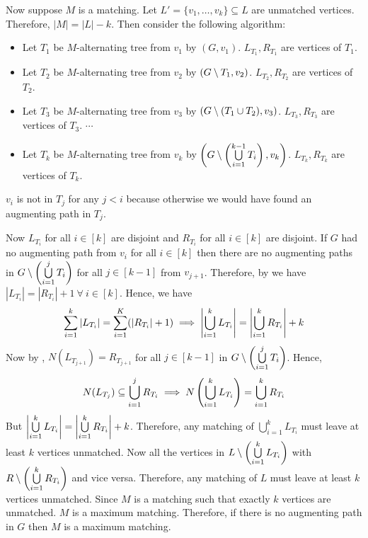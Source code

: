 Now suppose $M$ is a matching. Let $L'=\{v_1,\dots, v_k\}\subseteq L$ are unmatched vertices. Therefore, $|M|=|L|-k$. Then consider the following algorithm:
\begin{itemize}
	\item Let $T_1$ be $M$-alternating tree from $v_1$ by  $(G,v_1)$. $L_{T_1}, R_{T_1}$ are vertices of $T_1$.
	\item Let $T_2$ be $M$-alternating tree from $v_2$ by  $\left(G\setminus T_1,v_2\right)$. $L_{T_2}, R_{T_2}$ are vertices of $T_2$.
	\item Let $T_3$ be $M$-alternating tree from $v_3$ by  $\left(G\setminus (T_1\cup T_2),v_3\right)$.  $L_{T_3}, R_{T_3}$ are vertices of $T_3$. $\cdots$
	\item Let $T_k$ be $M$-alternating tree from $v_k$ by  $\left(G\setminus \left(\bigcup\limits_{i=1}^{k-1}T_i\right),v_k\right)$.  $L_{T_k}, R_{T_k}$ are vertices of $T_k$.
\end{itemize}
\begin{observation}
	$v_i$ is not in $T_j$ for any $j<i$ because otherwise we would have found an augmenting path in $T_j$.
\end{observation}

Now $L_{T_i}$ for all $i\in[k]$ are disjoint and $R_{T_i}$ for all $i\in[k]$ are disjoint. If $G$ had no augmenting path from $v_i$ for all $i\in[k]$ then there are no augmenting paths in $G\setminus\left(\bigcup\limits_{i=1}^{j}T_i\right)$ for all $j\in[k-1]$ from $v_{j+1}$. Therefore, by  we have $|L_{T_i}|=|R_{T_i}|+1\ \forall\ i\in[k]$. Hence, we have $$\sum\limits_{i=1}^k |L_{T_i}|=\sum_{i=1}^K (|R_{T_i}|+1)\implies\left| \bigcup_{i=1}^k L_{T_i}\right|=\left|\bigcup_{i=1}^k R_{T_i}\right|+k$$Now by , $N(L_{T_{j+1}})=R_{T_{j+1}}$ for all $j\in[k-1]$ in $G\setminus\left(\bigcup\limits_{i=1}^{j}T_i\right)$. Hence, $$N(L_{T_j})\subseteq \bigcup\limits_{i=1}^jR_{T_i}\implies N\left( \bigcup\limits_{i=1}^k L_{T_i} \right)=\bigcup\limits_{i=1}^kR_{T_i}$$But $\left| \bigcup\limits_{i=1}^k L_{T_i}\right|=\left|\bigcup\limits_{i=1}^k R_{T_i}\right|+k$. Therefore, any matching of $\bigcup\limits_{i=1}^kL_{T_i}$ must leave at least $k$ vertices unmatched. Now all the vertices in $L\setminus \left(\bigcup\limits_{i=1}^kL_{T_i}\right)$ with $R\setminus \left(\bigcup\limits_{i=1}^kR_{T_i}\right)$ and vice versa. Therefore, any matching of $L$ must leave at least $k$ vertices unmatched. Since $M$ is a matching such that exactly $k$ vertices are unmatched. $M$ is a maximum matching. Therefore, if there is no augmenting path in $G$ then $M$ is a maximum matching.

